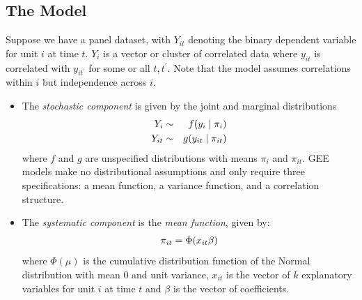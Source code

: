 \documentclass[letterpaper,10pt,english]{sphinxmanual}
\begin{document}
\subsection{The Model}
\label{vignette:id128}
Suppose we have a panel dataset, with \(Y_{it}\) denoting the binary
dependent variable for unit \(i\) at time \(t\). \(Y_{i}\)
is a vector or cluster of correlated data where \(y_{it}\) is
correlated with \(y_{it^\prime}\) for some or all
\(t, t^\prime\). Note that the model assumes correlations within
\(i\) but independence across \(i\).
\begin{itemize}
\item {} 
The \emph{stochastic component} is given by the joint and marginal
distributions
\begin{gather}
\begin{split}\begin{aligned}
Y_{i} &\sim& f(y_{i} \mid \pi_{i})\\
Y_{it} &\sim& g(y_{it} \mid \pi_{it})\end{aligned}\end{split}\notag
\end{gather}
where \(f\) and \(g\) are unspecified distributions with
means \(\pi_{i}\) and \(\pi_{it}\). GEE models make no
distributional assumptions and only require three specifications: a
mean function, a variance function, and a correlation structure.

\item {} 
The \emph{systematic component} is the \emph{mean function}, given by:
\begin{gather}
\begin{split}\pi_{it} = \Phi(x_{it} \beta)\end{split}\notag
\end{gather}
where \(\Phi(\mu)\) is the cumulative distribution function of
the Normal distribution with mean 0 and unit variance, \(x_{it}\)
is the vector of \(k\) explanatory variables for unit \(i\)
at time \(t\) and \(\beta\) is the vector of coefficients.


\end{itemize}
\end{document}
